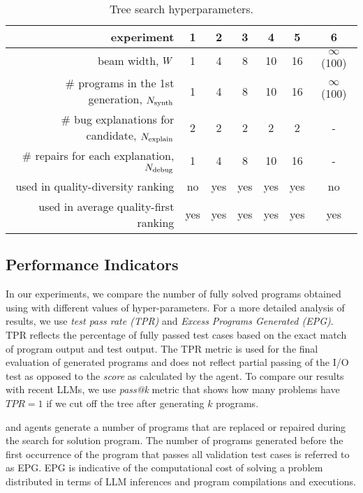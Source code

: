 \begin{table}
    \centering
    \caption{Tree search hyperparameters.}\small
    \label{tab:w-n}\vspace*{-4mm}
    \begin{tabular}{rcccccc}
    \toprule
    experiment & 1 & 2 & 3 & 4 & 5 & 6 \\
    \midrule
     beam width, $W{}$ & 1 & 4 & 8 & 10 & 16 & $\infty$ (100) \\
     \# programs in the 1st generation, $N_\text{synth}{}$ & 1 & 4 & 8 & 10 & 16 & $\infty$ (100) \\
     \# bug explanations for candidate, $N_\text{explain}{}$ & 2 & 2 & 2 & 2 & 2 & - \\
     \# repairs for each explanation, $N_\text{debug}{}$ & 1 & 4 & 8 & 10 & 16 & - \\
     \midrule
     used in quality-diversity ranking & 
     no & yes & yes & yes & yes & no \\
     used in average quality-first ranking  & 
     yes & yes & yes & yes & yes & yes \\
     \bottomrule
    \end{tabular}
\end{table}



\newpage \subsection{Performance Indicators}
\label{sec:metrics}

\sloppy %
In our experiments, we compare 
the number of fully solved programs obtained using \method{} with different values of hyper-parameters. 
For a more detailed analysis of results, we use \emph{test pass rate (TPR)} and \emph{Excess Programs Generated (EPG)}.
TPR reflects the percentage of fully passed test cases based on the exact match of program output and test output. 
The TPR metric is used for the final evaluation of generated programs and does not reflect partial passing of the I/O test as opposed to the \emph{score} as calculated by the \rank{} agent. 
To compare our results with recent LLMs, we use \emph{pass@k} metric that shows how many problems have $TPR=1$ if we cut off the tree after generating $k$ programs. 

\debug{} and \execute{} agents generate a number of programs that are replaced or repaired during the search for solution program. 
The number of programs generated before the first occurrence of the program that passes all validation test cases is referred to as EPG. 
EPG is indicative of the computational cost of solving a problem distributed in terms of LLM inferences and program compilations and executions.

